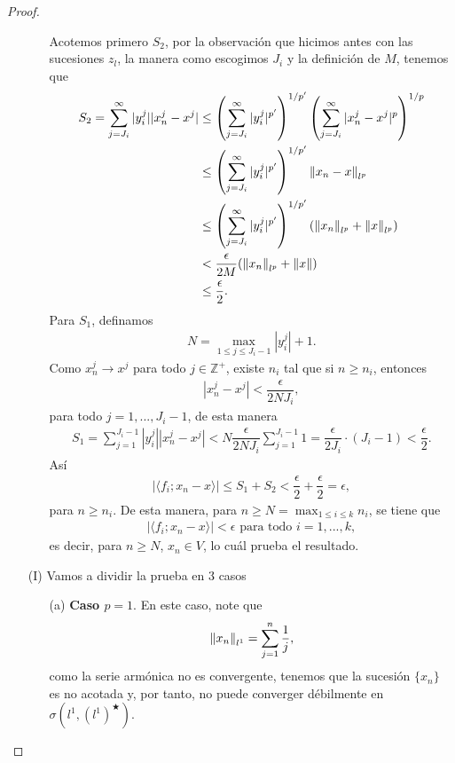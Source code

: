 \begin{proof}
\begin{enumerate}
\begin{itemize}
            Acotemos primero $S_2$, por la observación que hicimos antes con las sucesiones $z_l$, la manera como escogimos $J_i$ y la definición de $M$, tenemos que 
            \begin{align*}
                S_2=\sum_{j=J_i}^\infty |y_i^j||x_n^j-x^j|&\leq \left(\sum_{j=J_i}^\infty |y_i^j|^{p'}\right)^{1/p'}\left(\sum_{j=J_i}^\infty|x_n^j-x^j|^p\right)^{1/p}\\
                &\leq  \left(\sum_{j=J_i}^\infty |y_i^j|^{p'}\right)^{1/p'}\left\|x_n-x\right\|_{l^p}\\
                &\leq \left(\sum_{j=J_i}^\infty |y_i^j|^{p'}\right)^{1/p'}\left(\left\|x_n\right\|_{l^p}+\left\|x\right\|_{l^p}\right)\\
                &<\dfrac{\epsilon}{2M}(\left\|x_n\right\|_{l^p}+\left\|x\right\|)\\
                &\leq \dfrac{\epsilon}{2}.
            \end{align*}
            Para $S_1$, definamos
            \begin{align*}
                N=\max_{1\leq j\leq J_i-1}|y_i^j|+1.
            \end{align*}
            Como $x_n^j\to x^j$ para todo $j \in \mathbb{Z}^+$, existe $n_i$ tal que si $n\geq n_i$, entonces 
            \begin{align*}
                |x_n^j-x^j|<\dfrac{\epsilon}{2NJ_i},
            \end{align*}
            para todo $j=1,...,J_i-1$, de esta manera
            \begin{align*}
                S_1=\sum_{j=1}^{J_i-1}|y_i^j||x_n^j-x^j|< N\dfrac{\epsilon}{2NJ_i}\sum_{j=1}^{J_i-1}1=\dfrac{\epsilon}{2J_i}\cdot(J_i-1)<\dfrac{\epsilon}{2}.
            \end{align*}
            Así
            \begin{align*}
                |\langle f_i;x_n-x\rangle|\leq S_1+S_2<\dfrac{\epsilon}{2}+\dfrac{\epsilon}{2}=\epsilon,
            \end{align*}
            para $n\geq n_i$. De esta manera, para $n\geq N=\max_{1\leq i\leq k}n_i$, se tiene que 
            \begin{align*}
                |\langle f_i;x_n-x\rangle|<\epsilon \text{ para todo } i=1,...,k,
            \end{align*}
            es decir, para $n\geq N$, $x_n\in V$, lo cuál prueba el resultado. 
        \end{itemize} 
        \item[(I)] Vamos a dividir la prueba en 3 casos
        \begin{enumerate}
            \item[(a)] \textbf{Caso $p=1$}. En este caso, note que 
            \begin{align*}
                \left\|x_n\right\|_{l^1}=\sum_{j=1}^n\dfrac{1}{j},
            \end{align*}
            como la serie armónica no es convergente, tenemos que la sucesión $\{x_n\}$ es no acotada y, por tanto, no puede converger débilmente en $\sigma(l^1,(l^1)^\bigstar)$.


\end{enumerate}
\end{enumerate}
\end{proof}
